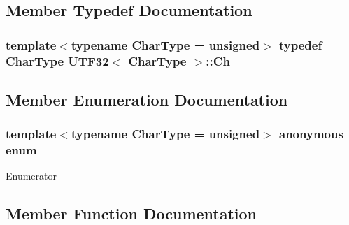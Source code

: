 \subsection{Member Typedef Documentation}
\subsubsection[{\texorpdfstring{Ch}{Ch}}]{\setlength{\rightskip}{0pt plus 5cm}template$<$typename Char\+Type  = unsigned$>$ typedef Char\+Type {\bf U\+T\+F32}$<$ Char\+Type $>$\+::{\bf Ch}}\hypertarget{structUTF32_ab4502672d56436e730ca5f647bb52be9}{}\label{structUTF32_ab4502672d56436e730ca5f647bb52be9}


\subsection{Member Enumeration Documentation}
\subsubsection[{\texorpdfstring{anonymous enum}{anonymous enum}}]{\setlength{\rightskip}{0pt plus 5cm}template$<$typename Char\+Type  = unsigned$>$ anonymous enum}\hypertarget{structUTF32_abe791c52b9d1305aacf92ddc15c11ab4}{}\label{structUTF32_abe791c52b9d1305aacf92ddc15c11ab4}
\begin{Desc}
\item[Enumerator]\par
\begin{description}
\item[{\em 
support\+Unicode\hypertarget{structUTF32_abe791c52b9d1305aacf92ddc15c11ab4ae44852fd9d88deed3a956b89108412a5}{}\label{structUTF32_abe791c52b9d1305aacf92ddc15c11ab4ae44852fd9d88deed3a956b89108412a5}
}]\end{description}
\end{Desc}


\subsection{Member Function Documentation}
